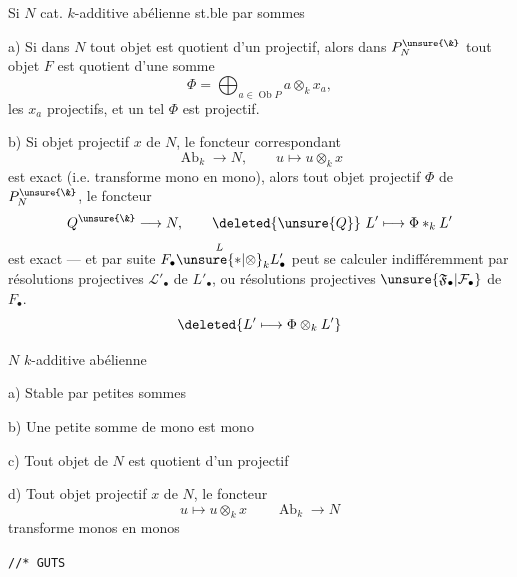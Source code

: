 \unsure{(*)} Si $N$ cat. $k$-additive abélienne
st.ble par   sommes

a) Si dans $N$ tout objet est quotient d'un projectif, alors dans
$P_N^{\unsure{\&}}$ tout objet $F$ est quotient d'une somme
\[
\Phi=\bigoplus_{a\in\operatorname{Ob}P}a\otimes_kx_a,
\]
les $x_a$ projectifs, et un tel $\Phi$ est projectif.

b) Si    objet projectif
 $x$ de $N$, le foncteur correspondant
\[
\operatorname{Ab}_k\longrightarrow N,\qquad u\longmapsto u\otimes_kx
\]
est exact (i.e. transforme mono en mono), alors
 
tout objet projectif $\Phi$ de 
$P_N^{\unsure{\&}}$, le foncteur
\[
Q^{\unsure{\&}}\longrightarrow N,\qquad
\deleted{\unsure{Q}}\ L'\longmapsto\Phi *_kL'
\]
est exact --- et par suite
$F_\bullet\overset L{\unsure{*|\otimes}}_kL'_\bullet$
peut se calculer indifféremment par résolutions projectives
$\mathcal L'_\bullet$ de $L'_\bullet$, ou résolutions projectives
$\unsure{\mathfrak F_\bullet|\mathcal F_\bullet}$ de $F_\bullet$.
\[
\deleted{L'\longmapsto\Phi\otimes_kL'}
\]

$N$ $k$-additive abélienne

a) Stable par petites sommes

b) Une petite somme de mono est mono

c) Tout objet de $N$ est quotient d'un projectif

d)  Tout objet projectif $x$ de $N$, le foncteur
\[
u\longmapsto u\otimes_kx\qquad \operatorname{Ab}_k\longrightarrow N
\]
transforme monos en monos

\texttt{//*\ GUTS\ \ }

